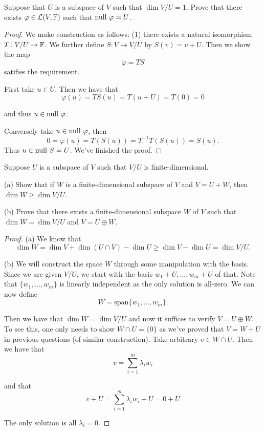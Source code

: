 \documentclass{extarticle}
\begin{document}
\begin{problem}{17}
    Suppose that \(U\) is a subspace of \(V\) such that \(\dim V / U = 1\). Prove that there exists 
    \(\varphi \in \mathcal{L}(V, \mathbb{F})\) such that \(\text{null } \varphi = U\).
\end{problem}

\begin{proof}
We make construction as follows: (1) there exists a natural isomorphism \(T \colon V / U \to 
\mathbb{F}\). We further define \(S \colon V \to V / U\) by \(S(v) = v + U\). Then we show the map 
\[\varphi = TS\]
satifies the requirement. 

First take \(u \in U\). Then we have that 
\[\varphi(u) = TS(u) = T(u + U) = T(0) = 0\]

and thus \(u \in \text{null } \varphi\). 

Conversely take \(u \in \text{null } \varphi\), then 
\[0 = \varphi(u) = T(S(u)) = T^{-1} T(S(u)) = S(u).\]
Thus \(u \in \text{null } S = U\). We've finished the proof. 
\end{proof}


\begin{problem}{18}
    Suppose \(U\) is a subspace of \(V\) such that \(V / U\) is finite-dimensional. 

    (a) Show that if \(W\) is a finite-dimensional subspace of \(V\) and \(V = U + W\), 
    then \(\dim W \geq \dim V / U\). 

    (b) Prove that there exists a finite-dimensional subspace \(W\) of \(V\) such that 
    \(\dim W = \dim V / U\) and \(V = U \oplus W\).
\end{problem}

\begin{proof}
(a) We know that 
\[\dim W = \dim V + \dim (U \cap V) - \dim U \geq \dim V - \dim U = \dim V / U.\]

(b) We will construct the space \(W\) through some manipulation with the basis. Since we 
are given \(V/ U\), we start with the basis \(w_1 + U, \ldots, w_m + U\) of that. Note that 
\(\{w_1, \ldots, w_m\}\) is linearly independent as the only solution is all-zero. We can now 
define 
\[W = \text{span}\{w_1, \ldots, w_m\}.\]

Then we have that \(\dim W = \dim V / U\) and now it suffices to verify \(V = U \oplus W\). To 
see this, one only needs to show \(W \cap U = \{0\}\) as we've proved that \(V = W + U\) in 
previous questions (of similar construction). Take arbitrary \(v \in W \cap U\). Then we have that 
\[v = \sum_{i=1}^{m} \lambda_i w_i \]

and that 
\[v + U = \sum_{i=1}^{m} \lambda_i w_i + U = 0 + U\]

The only solution is all \(\lambda_i = 0\). 
\end{proof}
\end{document}
